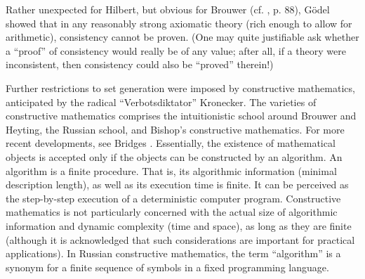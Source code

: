 Rather unexpected for Hilbert, but obvious for Brouwer
(cf. \cite{g-brower}, p. 88),
 G\"odel \cite{godel1} showed that
in any
reasonably strong axiomatic theory (rich enough to allow for
arithmetic),
consistency cannot be proven. (One may quite justifiable ask whether a
``proof'' of consistency would really be of any value; after all, if a
theory were inconsistent, then consistency could also be ``proved''
therein!)

Further restrictions to set generation were imposed by
constructive mathematics, anticipated by the radical
``Verbotsdiktator'' Kronecker. The varieties of constructive mathematics
\cite{bridges-richman} comprises
the intuitionistic
school around Brouwer and  Heyting, the Russian school, and Bishop's
constructive mathematics. For  more recent developments, see Bridges
\cite{bishop-bridges,bridges-richman}.
Essentially, the existence of  mathematical objects is accepted only if
the objects can be constructed by an
algorithm.
An algorithm is a finite procedure. That is, its algorithmic information
(minimal description length), as well as its execution time is finite.
It can be perceived
as the step-by-step execution of a deterministic computer program.
Constructive mathematics is not particularly concerned with the actual
size of algorithmic information
and dynamic complexity (time and space), as long as they are
finite (although it is acknowledged that such considerations are
important for practical applications).
In Russian constructive mathematics, the term ``algorithm'' is
a synonym for a finite sequence of symbols in a fixed programming
language.



